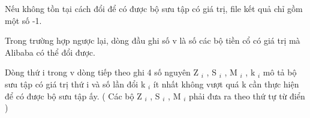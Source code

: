 Nếu không tồn tại cách đổi để có được bộ sưu tập có giá trị, file kết quả chỉ gồm một số -1.

Trong trường hợp ngược lại, dòng đầu ghi số v là số các bộ tiền cổ có giá trị mà Alibaba có thể đổi được.

Dòng thứ i trong v dòng tiếp theo ghi 4 số nguyên Z $_ i $ , S $_ i $ , M $_ i $ , k $_ i $ mô tả bộ sưu tập có giá trị thứ i và số lần đổi k $_ i $ ít nhất không vượt quá k cần thực hiện để có được bộ sưu tập ấy. ( Các bộ Z $_ i $ , S $_ i $ , M $_ i $ phải đưa ra theo thứ tự từ điển )

\